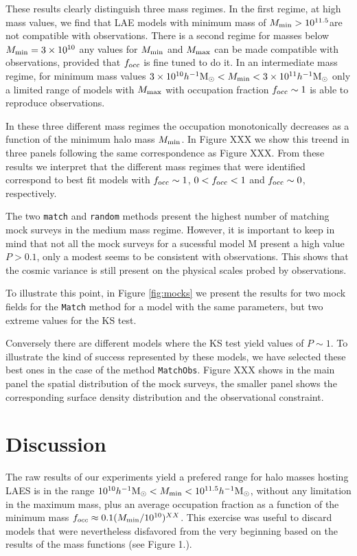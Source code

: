 \documentclass[usenatbib]{mn2e}
\newcommand{\hMsun}{{\ifmmode{h^{-1}{\rm {M_{\odot}}}}\else{$h^{-1}{\rm{M_{\odot}}}$}\fi}}
\begin{document}
These results clearly distinguish three mass regimes. In the first regime, at
high mass values, we find that LAE models with minimum mass of $M_{\rm
  min}>10^{11.5}$\hMsun are not compatible with observations. There is
a second regime for masses below $M_{\rm
  min}=3\times 10^{10}$ any values for $M_{\rm min}$ and $M_{\rm max}$
can be made compatible with observations, provided that
$f_{\rm occ}$ is fine tuned to do it. In an intermediate mass regime,
for minimum mass values $3\times 10^{10}\hMsun < M_{\rm min}< 3\times 10^{11}\hMsun$ only a
limited range of models with $M_{\rm max}$ with occupation fraction
$f_{\rm occ}\sim 1$ is able to reproduce observations. 

In these three different mass regimes the occupation monotonically
decreases as a function of the minimum halo mass $M_{\rm min}$. In
Figure XXX we show this treend in three panels following the same
correspondence as Figure XXX. From these results we interpret that the
different mass regimes that were identified correspond to best fit
models with $f_{\rm occ}\sim 1$, $0<f_{\rm occ}<1$ and $f_{\rm
  occ}\sim 0$, respectively. 


The two {\tt match} and {\tt random} methods present the highest
number of matching mock surveys in the medium mass regime. However, it
is important to keep in mind that not all the mock surveys for a
sucessful model ${\mathrm M}$ present a high value $P>0.1$, only a
modest seems to be consistent with observations. This shows that the
cosmic variance is still present on the physical scales probed by
observations. 

To illustrate this point, in Figure \ref{fig:mocks} we present the
results for two mock fields for the {\tt{Match}} method for a model
with the same parameters, but two extreme values for the KS test. 


Conversely there are different models where the KS test yield values of
$P\sim 1$. To illustrate the kind of success represented by these
models, we have selected these best ones in the case of the method
{\tt{MatchObs}}. Figure XXX shows in the main panel the spatial
distribution of the mock surveys, the smaller panel shows the
corresponding surface density distribution and the observational
constraint.  

\section{Discussion}

The raw results of our experiments yield a prefered range for
halo masses hosting LAES is in the range $10^{10}\hMsun<M_{\rm
  min}<10^{11.5}\hMsun$, without any limitation in the  maximum mass,
plus an average occupation fraction as a function of the minimum mass
$f_{occ}\approx 0.1 (M_{\rm min}/10^{10})^{XX}$. This exercise was
useful to discard models that were nevertheless disfavored from the
very beginning based on the results of the mass functions (see Figure 1.).
\end{document}
